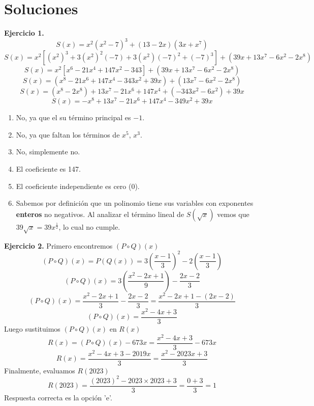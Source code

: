 \newpage

\section*{\large Soluciones}
{
    \textbf{Ejercicio 1.}
    \[S(x) = x^2(x^2 - 7)^3 + (13 - 2x)(3x + x^7)\]
    \[S(x) = x^2 \left[ (x^2)^3 + 3 (x^2)^2(-7) + 3 (x^2)(-7)^2 + (-7)^3 \right] + (39x + 13x^7 - 6x^2 - 2x^8)\]
    \[S(x) = x^2 \left[ x^6 - 21x^4 + 147 x^2 - 343 \right] + (39x + 13x^7 - 6x^2 - 2x^8)\]
    \[S(x) = (x^8 - 21x^6 + 147 x^4 - 343x^2 + 39x) + (13x^7 - 6x^2 - 2x^8)\]
    \[S(x) = (x^8 - 2x^8) + 13x^7 - 21x^6 + 147 x^4 + (- 343x^2 - 6x^2) + 39x\]
    \[S(x) = -x^8 + 13x^7 - 21x^6 + 147 x^4 - 349x^2 + 39x\]

        \begin{enumerate}
            \item No, ya que el su término principal es $-1$.
            \item No, ya que faltan los términos de $x^5$, $x^3$.
            \item No, simplemente no.
            \item El coeficiente es 147.
            \item El coeficiente independiente es cero (0).
            \item Sabemos por definición que un polinomio tiene sus variables con exponentes \textbf{enteros} no negativos. Al analizar el término lineal de $S(\sqrt {x})$ vemos que $39\sqrt {x} = 39 x^{\frac{1}{2}}$, lo cual no cumple.
        \end{enumerate}

    \textbf{Ejercicio 2.} Primero encontremos $(P \circ Q)(x)$
    \[ (P \circ Q)(x) = P(Q(x)) = 3\left( \frac{x - 1}{3} \right)^2 - 2\left( \frac{x - 1}{3} \right)\]
    \[ (P \circ Q)(x) = 3\left( \frac{x^2 - 2x + 1}{9} \right) - \frac{2x - 2}{3}\]
    \[ (P \circ Q)(x) = \frac{x^2 - 2x + 1}{3} - \frac{2x - 2}{3} = \frac{x^2 - 2x + 1 - (2x - 2)}{3}\]
    \[ (P \circ Q)(x) = \frac{x^2 - 4x + 3}{3}\]
    Luego sustituimos $(P \circ Q)(x)$ en $R(x)$
    \[R(x) = (P \circ Q)(x) - 673x = \frac{x^2 - 4x + 3}{3} - 673x\]
    \[R(x) = \frac{x^2 - 4x + 3 - 2019x}{3} = \frac{x^2 - 2023x + 3}{3}\]
    Finalmente, evaluamos $R(2023)$
    \[R(2023) = \frac{(2023)^2 - 2023\times 2023 + 3}{3} = \frac{0 + 3}{3} = 1\]
    Respuesta correcta es la opción 'e'.
}\label{sec:soluciones}